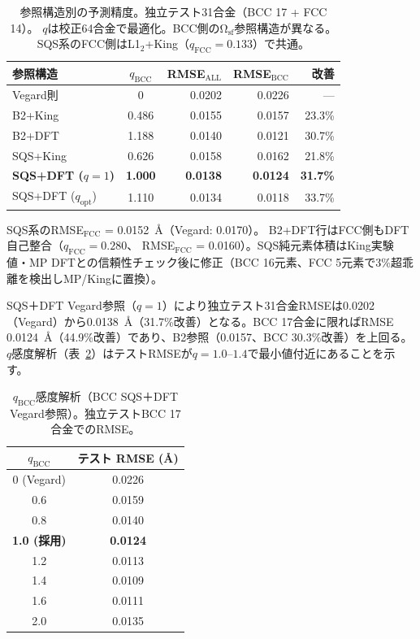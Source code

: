 \documentclass[5p,10pt]{elsarticle}
\begin{document}
\begin{table}[H]
\centering
\caption{参照構造別の予測精度。独立テスト31合金（BCC 17 + FCC 14）。
$q$は校正64合金で最適化。BCC側のΩ$_\text{sf}$参照構造が異なる。
SQS系のFCC側はL1$_2$+King（$q_\text{FCC} = 0.133$）で共通。}
\label{tab:sqs_rmse}
\scriptsize
\begin{tabular}{@{}lcrrr@{}}
\toprule
参照構造 & $q_\text{BCC}$ & RMSE$_\text{ALL}$ & RMSE$_\text{BCC}$ & 改善 \\
\midrule
Vegard則 & 0 & 0.0202 & 0.0226 & --- \\
B2+King & 0.486 & 0.0155 & 0.0157 & 23.3\% \\
B2+DFT & 1.188 & 0.0140 & 0.0121 & 30.7\% \\
SQS+King & 0.626 & 0.0158 & 0.0162 & 21.8\% \\
\textbf{SQS+DFT ($q\!=\!1$)} & \textbf{1.000} & \textbf{0.0138} & \textbf{0.0124} & \textbf{31.7\%} \\
SQS+DFT ($q_\text{opt}$) & 1.110 & 0.0134 & 0.0118 & 33.7\% \\
\bottomrule
\end{tabular}
\par\smallskip
{\scriptsize SQS系のRMSE$_\text{FCC}$ = 0.0152~\AA{}（Vegard: 0.0170）。
B2+DFT行はFCC側もDFT自己整合（$q_\text{FCC} = 0.280$、
RMSE$_\text{FCC}$ = 0.0160）。SQS純元素体積はKing実験値・MP DFTとの信頼性チェック後に修正（BCC 16元素、FCC 5元素で3\%超乖離を検出しMP/Kingに置換）。}
\end{table}

SQS＋DFT Vegard参照（$q = 1$）により独立テスト31合金RMSEは0.0202（Vegard）から0.0138~\AA{}（31.7\%改善）となる。BCC 17合金に限ればRMSE 0.0124~\AA{}（44.9\%改善）であり、B2参照（0.0157、BCC 30.3\%改善）を上回る。$q$感度解析（表~\ref{tab:q_sensitivity}）はテストRMSEが$q = 1.0$--$1.4$で最小値付近にあることを示す。

\begin{table}[H]
\centering
\caption{$q_\text{BCC}$感度解析（BCC SQS＋DFT Vegard参照）。独立テストBCC 17合金でのRMSE。}
\label{tab:q_sensitivity}
\footnotesize
\begin{tabular}{@{}cc@{}}
\toprule
$q_\text{BCC}$ & テスト RMSE (\AA) \\
\midrule
0 (Vegard) & 0.0226 \\
0.6 & 0.0159 \\
0.8 & 0.0140 \\
\textbf{1.0 (採用)} & \textbf{0.0124} \\
1.2 & 0.0113 \\
1.4 & 0.0109 \\
1.6 & 0.0111 \\
2.0 & 0.0135 \\
\bottomrule
\end{tabular}
\end{table}
\end{document}
